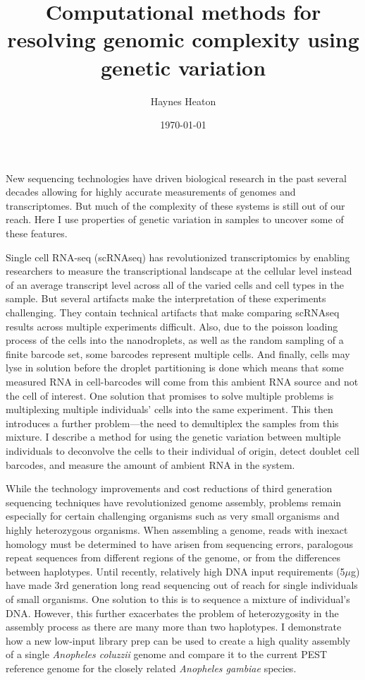\documentclass[12pt]{article}
\title{Computational methods for resolving genomic complexity using genetic variation}
\author{
        Haynes Heaton
}
\date{\today}
\begin{document}
\maketitle

\par{
New sequencing technologies have driven biological research in the past several decades allowing for highly accurate measurements of genomes and transcriptomes. But much of the complexity of these systems is still out of our reach. Here I use properties of genetic variation in samples to uncover some of these features.
} 
\par{
Single cell RNA-seq (scRNAseq) has revolutionized transcriptomics by enabling researchers to measure the transcriptional landscape at the cellular level instead of an average transcript level across all of the varied cells and cell types in the sample. But several artifacts make the interpretation of these experiments challenging. They contain technical artifacts that make comparing scRNAseq results across multiple experiments difficult. Also, due to the poisson loading process of the cells into the nanodroplets, as well as the random sampling of a finite barcode set, some barcodes represent multiple cells. And finally, cells may lyse in solution before the droplet partitioning is done which means that some measured RNA in cell-barcodes will come from this ambient RNA source and not the cell of interest. One solution that promises to solve multiple problems is multiplexing multiple individuals' cells into the same experiment. This then introduces a further problem---the need to demultiplex the samples from this mixture. I describe a method for using the genetic variation between multiple individuals to deconvolve the cells to their individual of origin, detect doublet cell barcodes, and measure the amount of ambient RNA in the system. 

}
\par{
While the technology improvements and cost reductions of third generation sequencing techniques have revolutionized genome assembly, problems remain especially for certain challenging organisms such as very small organisms and highly heterozygous organisms. When assembling a genome, reads with inexact homology must be determined to have arisen from sequencing errors, paralogous repeat sequences from different regions of the genome, or from the differences between haplotypes. Until recently, relatively high DNA input requirements (5$\mu$g) have made 3rd generation long read sequencing out of reach for single individuals of small organisms. One solution to this is to sequence a mixture of individual's DNA. However, this further exacerbates the problem of heterozygosity in the assembly process as there are many more than two haplotypes. I demonstrate how a new low-input library prep can be used to create a high quality assembly of a single \textit{Anopheles coluzzii} genome and compare it to the current PEST reference genome for the closely related \textit{Anopheles gambiae} species.
}
\end{document}
